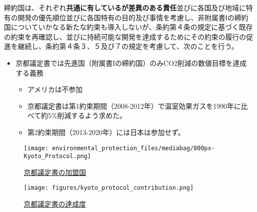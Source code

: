 \documentclass[
  xelatex,
  ja=standard]{bxjsarticle}
\providecommand{\tightlist}{%
  \setlength{\itemsep}{0pt}\setlength{\parskip}{0pt}}\usepackage{longtable,booktabs,array}
\begin{document}
\begin{tcolorbox}[enhanced jigsaw, title=\textcolor{quarto-callout-note-color}{\faInfo}\hspace{0.5em}{\href{https://www.mofa.go.jp/mofaj/gaiko/treaty/treaty_020413.html}{気候変動に関する国際連合枠組条約の京都議定書}　第10条}, bottomtitle=1mm, rightrule=.15mm, breakable, arc=.35mm, leftrule=.75mm, opacityback=0, colbacktitle=quarto-callout-note-color!10!white, left=2mm, coltitle=black, toptitle=1mm, titlerule=0mm, colback=white, bottomrule=.15mm, toprule=.15mm, colframe=quarto-callout-note-color-frame, opacitybacktitle=0.6]

締約国は、それぞれ\textbf{共通に有しているが差異のある責任}並びに各国及び地域に特有の開発の優先順位並びに各国特有の目的及び事情を考慮し、非附属書Ⅰの締約国についていかなる新たな約束も導入しないが、条約第４条の規定に基づく既存の約束を再確認し、並びに持続可能な開発を達成するためにその約束の履行の促進を継続し、条約第４条３、５及び７の規定を考慮して、次のことを行う。

\end{tcolorbox}

\begin{itemize}
\tightlist
\item
  京都議定書では先進国（附属書Iの締約国）のみCO2削減の数値目標を達成する義務

  \begin{itemize}
  \tightlist
  \item
    アメリカは不参加
  \item
    京都議定書は第1約束期間（2008-2012年）で温室効果ガスを1990年に比べて約5\%削減するよう求めた。
  \item
    第2約束期間（2013-2020年）には日本は参加せず。
  \end{itemize}
\end{itemize}

\begin{figure}[htpb]

{\centering \texttt{[image: environmental\_protection\_files/mediabag/800px-Kyoto\_Protocol.png]}

}

\caption{\href{https://commons.wikimedia.org/wiki/File:Kyoto_Protocol_parties.svg}{京都議定書の加盟国}}

\end{figure}

\begin{figure}[htpb]

{\centering \texttt{[image: figures/kyoto\_protocol\_contribution.png]}

}

\caption{\href{https://www.theguardian.com/environment/blog/2012/nov/26/kyoto-protocol-carbon-emissions}{京都議定書の達成度}}

\end{figure}
\end{document}
